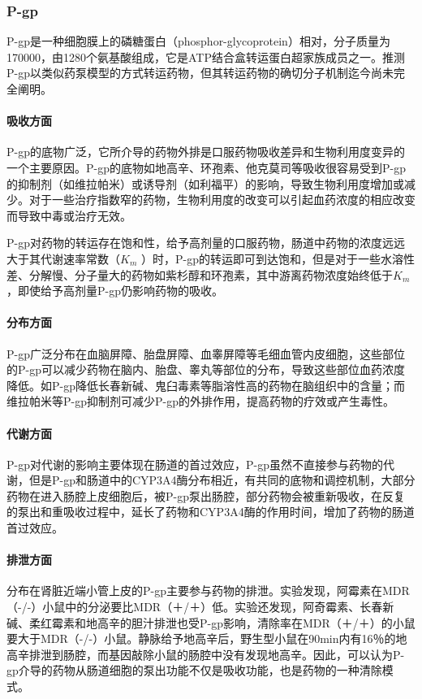 \subsubsection{P-gp}

P-gp是一种细胞膜上的磷糖蛋白（phosphor-glycoprotein）相对，分子质量为170000，由1280个氨基酸组成，它是ATP结合盒转运蛋白超家族成员之一。推测P-gp以类似药泵模型的方式转运药物，但其转运药物的确切分子机制迄今尚未完全阐明。
\paragraph{吸收方面}

P-gp的底物广泛，它所介导的药物外排是口服药物吸收差异和生物利用度变异的一个主要原因。P-gp的底物如地高辛、环孢素、他克莫司等吸收很容易受到P-gp的抑制剂（如维拉帕米）或诱导剂（如利福平）的影响，导致生物利用度增加或减少。对于一些治疗指数窄的药物，生物利用度的改变可以引起血药浓度的相应改变而导致中毒或治疗无效。

P-gp对药物的转运存在饱和性，给予高剂量的口服药物，肠道中药物的浓度远远大于其代谢速率常数（$K_m$
）时，P-gp的转运即可到达饱和，但是对于一些水溶性差、分解慢、分子量大的药物如紫杉醇和环孢素，其中游离药物浓度始终低于$K_m$ ，即使给予高剂量P-gp仍影响药物的吸收。
\paragraph{分布方面}

P-gp广泛分布在血脑屏障、胎盘屏障、血睾屏障等毛细血管内皮细胞，这些部位的P-gp可以减少药物在脑内、胎盘、睾丸等部位的分布，导致这些部位血药浓度降低。如P-gp降低长春新碱、鬼臼毒素等脂溶性高的药物在脑组织中的含量；而维拉帕米等P-gp抑制剂可减少P-gp的外排作用，提高药物的疗效或产生毒性。
\paragraph{代谢方面}

P-gp对代谢的影响主要体现在肠道的首过效应，P-gp虽然不直接参与药物的代谢，但是P-gp和肠道中的CYP3A4酶分布相近，有共同的底物和调控机制，大部分药物在进入肠腔上皮细胞后，被P-gp泵出肠腔，部分药物会被重新吸收，在反复的泵出和重吸收过程中，延长了药物和CYP3A4酶的作用时间，增加了药物的肠道首过效应。
\paragraph{排泄方面}

分布在肾脏近端小管上皮的P-gp主要参与药物的排泄。实验发现，阿霉素在MDR（-/-）小鼠中的分泌要比MDR（＋/＋）低。实验还发现，阿奇霉素、长春新碱、柔红霉素和地高辛的胆汁排泄也受P-gp影响，清除率在MDR（＋/＋）的小鼠要大于MDR（-/-）小鼠。静脉给予地高辛后，野生型小鼠在90min内有16％的地高辛排泄到肠腔，而基因敲除小鼠的肠腔中没有发现地高辛。因此，可以认为P-gp介导的药物从肠道细胞的泵出功能不仅是吸收功能，也是药物的一种清除模式。
